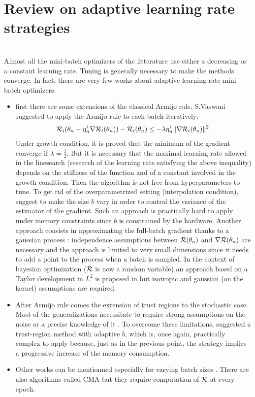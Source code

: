 \section{Review on adaptive learning rate strategies}
\label{adapt}
~~\\
Almost all the mini-batch optimizers of the litterature use either a decreasing or a constant learning rate. 
Tuning is generally necessary to make the methods converge. In fact, there are very few works about adaptive learning rate mini-batch optimizers:
\begin{itemize}
	\item first there are some extensions of the classical Armijo rule. S.Vaswani \cite{stochastic_armijo} suggested to apply the Armijo rule to each batch iteratively:
	\begin{equation*}
		\mathcal{R}_i(\theta_n-\eta_n^i \nabla \mathcal{R}_i(\theta_n))-\mathcal{R}_i(\theta_n) \leq -\lambda \eta_n^i \|\nabla \mathcal{R}_i(\theta_n)\|^2.
	\end{equation*}
	Under growth condition, it is proved that the minimum of the gradient converge if $\lambda=\frac12$. But it is necessary that the maximal learning rate allowed in the
        linesearch (research of the learning rate satisfying the above inequality) depends on the stiffness of the function and of a constant involved in the growth condition. Then
        the algorithm is not free from hyperparameters to tune. To get rid of the overparametrized setting (interpolation condition),
        \cite{armijo_batch_size,armijo_variance_reduction} suggest to make the size $b$ vary in order to control the variance of the estimator of the gradient. Such an approach is
        practically hard to apply 
        under memory constraints since $b$ is constrained by the hardware. Another approach consists in approximating the full-batch gradient thanks to a gaussian process
        \cite{armijo_GP}: %
        independence assumptions between $\mathcal{R}(\theta_n)$ and $\nabla \mathcal{R}(\theta_n)$ are necessary and the approach is limited to very small dimensions since it needs to add a point to the process when a batch is sampled. In the context of bayesian optimization ($\mathcal{R}$ is now a random variable) an approach based on a Taylor development in $L^2$ is proposed in \cite{armijo_L2} but isotropic and gaussian (on the kernel) assumptions are required. 
	\item After Armijo rule comes the extension of trust regions to the stochastic case. Most of the generalizations necessitate to require strong assumptions on the noise
          \cite{sto_TR_bounded} or a precise knowledge of it \cite{sto_TR_affine_noise,sto_TR_representative}. To overcome these limitations, \cite{sto_TR_sampling} suggested a
          trust-region method with adaptive $b$, which is, once again, practically complex to apply 
          because, just as in the previous point, the strategy implies a progressive increase of the memory consumption. %
	\item Other works can be mentionned especially for varying batch sizes \cite{adaptive_sampling,adaptive_batch,sgd_lauched}. There are also algorithms called CMA \cite{CMA,CMA_Light} but they require computation of $\mathcal{R}$ at every epoch.
\end{itemize}
